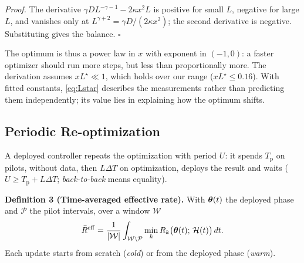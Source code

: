 \emph{Proof.} The derivative $\gamma D L^{-\gamma-1} - 2\kappa x^2 L$ is positive for small $L$, negative for large $L$, and vanishes only at $L^{\gamma+2}=\gamma D/(2\kappa x^2)$; the second derivative is negative. Substituting gives the balance. \hfill$\square$

The optimum is thus a power law in $x$ with exponent in $(-1,0)$: a faster optimizer should run more steps, but less than proportionally more. The derivation assumes $xL^\star \ll 1$, which holds over our range ($xL^\star\le 0.16$). With fitted constants, \eqref{eq:Lstar} describes the measurements rather than predicting them independently; its value lies in explaining how the optimum shifts.

\subsection{Periodic Re-optimization}
A deployed controller repeats the optimization with period $U$: it spends $T_{\mathrm{p}}$ on pilots, without data, then $L\Delta T$ on optimization, deploys the result and waits ($U \ge T_{\mathrm{p}}+L\Delta T$; \emph{back-to-back} means equality).

\textbf{Definition 3 (Time-averaged effective rate).} With $\boldsymbol{\theta}(t)$ the deployed phase and $\mathcal{P}$ the pilot intervals, over a window $\mathcal{W}$
\begin{equation}
    \bar{R}^{\mathrm{eff}} = \frac{1}{|\mathcal{W}|}\int_{\mathcal{W}\setminus\mathcal{P}} \min_k R_k\big(\boldsymbol{\theta}(t);\,\mathcal{H}(t)\big)\,dt .
    \label{eq:time_avg}
\end{equation}
Each update starts from scratch (\emph{cold}) or from the deployed phase (\emph{warm}).
